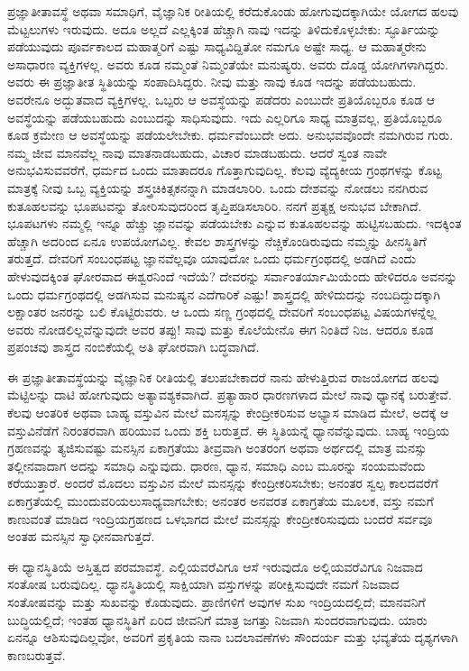 ಪ್ರಜ್ಞಾತೀತಾವಸ್ಥೆ ಅಥವಾ ಸಮಾಧಿಗೆ, ವೈಜ್ಞಾನಿಕ ರೀತಿಯಲ್ಲಿ ಕರೆದುಕೊಂಡು ಹೋಗುವುದಕ್ಕಾಗಿಯೇ ಯೋಗದ ಹಲವು ಮೆಟ್ಟಲುಗಳು ಇರುವುದು. ಅದೂ ಅಲ್ಲದೆ ಎಲ್ಲಕ್ಕಿಂತ ಹೆಚ್ಚಾಗಿ ನಾವು ಇದನ್ನು ತಿಳಿದುಕೊಳ್ಳಬೇಕು: ಸ್ಫೂರ್ತಿಯನ್ನು ಪಡೆಯುವುದು ಪೂರ್ವಕಾಲದ ಮಹಾತ್ಮರಿಗೆ ಎಷ್ಟು ಸಾಧ್ಯವಿದ್ದಿತೋ ನಮಗೂ ಅಷ್ಟೇ ಸಾಧ್ಯ. ಆ ಮಹಾತ್ಮರೇನು ಅಸಾಧಾರಣ ವ್ಯಕ್ತಿಗಳಲ್ಲ. ಅವರು ಕೂಡ ನಮ್ಮಂತೆ ನಿಮ್ಮಂತೆಯೇ ಮನುಷ್ಯರು. ಅವರು ದೊಡ್ಡ ಯೋಗಿಗಳಾಗಿದ್ದರು. ಅವರು ಈ ಪ್ರಜ್ಞಾತೀತ ಸ್ಥಿತಿಯನ್ನು ಸಂಪಾದಿಸಿದ್ದರು. ನೀವು ಮತ್ತು ನಾವು ಕೂಡ ಇದನ್ನು ಪಡೆಯಬಹುದು. ಅವರೇನೂ ಅದ್ಭುತವಾದ ವ್ಯಕ್ತಿಗಳಲ್ಲ. ಒಬ್ಪರು ಆ ಅವಸ್ಥೆಯನ್ನು ಪಡೆದರು ಎಂಬುದೇ ಪ್ರತಿಯೊಬ್ಬರೂ ಕೂಡ ಆ ಅವಸ್ಥೆಯನ್ನು ಪಡೆಯಬಹುದು ಎಂಬುದನ್ನು ಸಾಧಿಸುವುದು. ಇದು ಎಲ್ಲರಿಗೂ ಸಾಧ್ಯ ಮಾತ್ರವಲ್ಲ, ಪ್ರತಿಯೊಬ್ಬರೂ ಕೂಡ ಕ್ರಮೇಣ ಆ ಅವಸ್ಥೆಯನ್ನು ಪಡೆಯಲೇಬೇಕು. ಧರ್ಮವೆಂಬುದೇ ಅದು. ಅನುಭವವೊಂದೇ ನಮಗಿರುವ ಗುರು. ನಮ್ಮ ಜೀವ ಮಾನವೆಲ್ಲ ನಾವು ಮಾತನಾಡಬಹುದು, ವಿಚಾರ ಮಾಡಬಹುದು. ಆದರೆ ಸ್ವಂತ ನಾವೇ ಅನುಭವಿಸುವವರೆಗೆ, ಧರ್ಮದ ಒಂದು ಮಾತಾದರೂ ಗೊತ್ತಾಗುವುದಿಲ್ಲ. ಕೆಲವು ವ್ಯೆದ್ಯಕೀಯ ಗ್ರಂಥಗಳನ್ನು ಕೊಟ್ಟ ಮಾತ್ರಕ್ಕೆ ನೀವು ಒಬ್ಬ ವ್ಯಕ್ತಿಯನ್ನು ಶಸ್ತ್ರಚಿಕಿತ್ಸಕನನ್ನಾಗಿ ಮಾಡಲಾರಿರಿ. ಒಂದು ದೇಶವನ್ನು ನೋಡಲು ನನಗಿರುವ ಕುತೂಹಲವನ್ನು ಭೂಪಟವನ್ನು ತೋರಿಸುವುದರಿಂದ ತೃಪ್ತಿಪಡಿಸಲಾರಿರಿ. ನನಗೆ ಪ್ರತ್ಯಕ್ಷ ಅನುಭವ ಬೇಕಾಗಿದೆ. ಭೂಪಟಗಳು ನಮ್ಮಲ್ಲಿ ಇನ್ನೂ ಹೆಚ್ಚು ಜ್ಞಾನವನ್ನು ಪಡೆಯಬೇಕು ಎನ್ನುವ ಕುತೂಹಲವನ್ನು ಹುಟ್ಟಿಸಬಹುದು. ಇದಕ್ಕಿಂತ ಹೆಚ್ಚಾಗಿ ಅದರಿಂದ ಏನೂ ಉಪಯೋಗವಿಲ್ಲ. ಕೇವಲ ಶಾಸ್ತ್ರಗಳನ್ನು ನೆಚ್ಚಿಕೊಂಡಿರುವುದು ನಮ್ಮನ್ನು ಹೀನಸ್ಥಿತಿಗೆ ತರುತ್ತದೆ. ದೇವರಿಗೆ ಸಂಬಂಧಪಟ್ಟ ಜ್ಞಾನವೆಲ್ಲವೂ ಯಾವುದೋ ಒಂದು ಧರ್ಮಗ್ರಂಥದಲ್ಲಿ ಅಡಗಿದೆ ಎಂದು ಹೇಳುವುದಕ್ಕಿಂತ ಘೋರವಾದ ಈಶ್ವರನಿಂದೆ ಇದೆಯೆ? ದೇವರನ್ನು ಸರ್ವಾಂತರ್ಯಾಮಿಯೆಂದು ಹೇಳಿದರೂ ಅವನನ್ನು ಒಂದು ಧರ್ಮಗ್ರಂಥದಲ್ಲಿ ಅಡಗಿಸುವ ಮನುಷ್ಯನ ಎದೆಗಾರಿಕೆ ಎಷ್ಟು! ಶಾಸ್ತ್ರದಲ್ಲಿ ಹೇಳಿದುದನ್ನು ನಂಬದಿದ್ದುದಕ್ಕಾಗಿ ಲಕ್ಷಾಂತರ ಜನರನ್ನು ಬಲಿ ಕೊಟ್ಟಿರುವರು. ಆ ಒಂದು ಸಣ್ಣ ಗ್ರಂಥದಲ್ಲಿ ದೇವರಿಗೆ ಸಂಬಂಧಪಟ್ಟ ವಿಷಯಗಳನ್ನೆಲ್ಲ ಅವರು ನೋಡಲಿಲ್ಲವೆನ್ನುವುದೇ ಅವರ ತಪ್ಪು! ಸಾವು ಮತ್ತು ಕೊಲೆಯೇನೊ ಈಗ ನಿಂತಿದೆ ನಿಜ. ಆದರೂ ಕೂಡ ಪ್ರಪಂಚವು ಶಾಸ್ತ್ರದ ನಂಬಿಕೆಯಲ್ಲಿ ಅತಿ ಘೋರವಾಗಿ ಬದ್ಧವಾಗಿದೆ. 

ಈ ಪ್ರಜ್ಞಾತೀತಾವಸ್ಥೆಯನ್ನು ವೈಜ್ಞಾನಿಕ ರೀತಿಯಲ್ಲಿ ತಲುಪಬೇಕಾದರೆ ನಾನು ಹೇಳುತ್ತಿರುವ ರಾಜಯೋಗದ ಹಲವು ಮೆಟ್ಟಿಲನ್ನು ದಾಟಿ ಹೋಗುವುದು ಅತ್ಯಾವಶ್ಯಕವಾಗಿದೆ. ಪ್ರತ್ಯಾಹಾರ ಧಾರಣಗಳಾದ ಮೇಲೆ ನಾವು ಧ್ಯಾನಕ್ಕೆ ಬರುತ್ತೇವೆ. ಕೆಲವು ಆಂತರಿಕ ಅಥವಾ ಬಾಹ್ಯ ವಸ್ತುವಿನ ಮೇಲೆ ಮನಸ್ಸನ್ನು ಕೇಂದ್ರೀಕರಿಸುವ ಅಭ್ಯಾಸ ಮಾಡಿದ ಮೇಲೆ, ಅದಕ್ಕೆ ಆ ವಸ್ತುವಿನೆಡೆಗೆ ನಿರಂತರವಾಗಿ ಹರಿಯುವ ಒಂದು ಶಕ್ತಿ ಬರುತ್ತದೆ. ಈ ಸ್ಥಿತಿಯನ್ನೆ ಧ್ಯಾನವೆನ್ನುವುದು. ಬಾಹ್ಯ ಇಂದ್ರಿಯ ಗ್ರಹಣವನ್ನು ತ್ಯಜಿಸುವಷ್ಟು ಮನಸ್ಸಿನ ಏಕಾಗ್ರತೆಯು ತೀವ್ರವಾಗಿ ಅಂತರಂಗ ಅಥವಾ ಅರ್ಥದಲ್ಲಿ ಮಾತ್ರ ಮನಸ್ಸು ತಲ್ಲೀನವಾದಾಗ ಅದನ್ನು ಸಮಾಧಿ ಎನ್ನುವುದು. ಧಾರಣ, ಧ್ಯಾನ, ಸಮಾಧಿ ಎಂಬ ಮೂರನ್ನು ಸಂಯಮವೆಂದು ಕರೆಯುತ್ತಾರೆ. ಅಂದರೆ ಮೊದಲು ವಸ್ತುವಿನ ಮೇಲೆ ಮನಸ್ಸನ್ನು ಕೇಂದ್ರೀಕರಿಸಬೇಕು; ಅನಂತರ ಸ್ವಲ್ಪ ಕಾಲದವರೆಗೆ ಏಕಾಗ್ರತೆಯಲ್ಲಿ ಮುಂದುವರಿಯಲು\break ಸಾಧ್ಯವಾಗಬೇಕು; ಅನಂತರ ಅನವರತ ಏಕಾಗ್ರತೆಯ ಮೂಲಕ, ವಸ್ತು ನಮಗೆ ಕಾಣುವಂತೆ ಮಾಡಿದ ಇಂದ್ರಿಯಗ್ರಹಣದ ಒಳಭಾಗದ ಮೇಲೆ ಮನಸ್ಸನ್ನು ಕೇಂದ್ರೀಕರಿಸುವುದು ಬಂದರೆ ಸರ್ವವೂ ಅಂತಹ ಮನಸ್ಸಿನ ಸ್ವಾಧೀನವಾಗುತ್ತದೆ. 

ಈ ಧ್ಯಾನಸ್ಥಿತಿಯೆ ಅಸ್ತಿತ್ವದ ಪರಮಾವಸ್ಥೆ. ಎಲ್ಲಿಯವರೆವಿಗೂ ಆಸೆ ಇರುವುದೊ ಅಲ್ಲಿಯವರೆವಿಗೂ ನಿಜವಾದ ಸಂತೋಷ ಬರುವುದಿಲ್ಲ. ಧ್ಯಾನಸ್ಥಿತಿಯಲ್ಲಿ ಸಾಕ್ಷಿಯಾಗಿ ವಸ್ತುಗಳನ್ನು ಪರೀಕ್ಷಿಸುವುದೇ ನಮಗೆ ನಿಜವಾದ ಸಂತೋಷವನ್ನು ಮತ್ತು ಸುಖವನ್ನು ಕೊಡುವುದು. ಪ್ರಾಣಿಗಳಿಗೆ ಅವುಗಳ ಸುಖ ಇಂದ್ರಿಯದಲ್ಲಿದೆ; ಮಾನವನಿಗೆ ಬುದ್ಧಿಯಲ್ಲಿದೆ; ಇಂತಹ ಧ್ಯಾನಸ್ಥಿತಿಗೆ ಏರಿದ ಜೀವನಿಗೆ ಮಾತ್ರ ಜಗತ್ತು ನಿಜವಾಗಿ ಸುಂದರವಾಗುವುದು. ಯಾರು ಏನನ್ನೂ ಆಶಿಸುವುದಿಲ್ಲವೋ, ಅವರಿಗೆ ಪ್ರಕೃತಿಯ ನಾನಾ ಬದಲಾವಣೆಗಳು ಸೌಂದರ್ಯ ಮತ್ತು ಭವ್ಯತೆಯ ದೃಶ್ಯಗಳಾಗಿ ಕಾಣಬರುತ್ತವೆ. 

